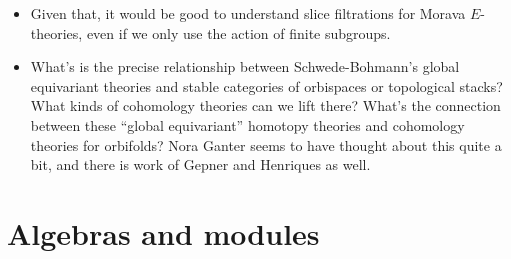 \documentclass[12pt,titlepage]{article}
\theoremstyle{plain}
\theoremstyle{definition}
\theoremstyle{remark}
\begin{document}
\begin{itemize}
\item Given that, it would be good to understand slice filtrations for Morava $E$-theories, even if we only use the action of finite subgroups.


\item What'{}s is the precise relationship between Schwede-Bohmann'{}s global equivariant theories and stable categories of orbispaces or topological stacks? What kinds of cohomology theories can we lift there? What'{}s the connection between these ``{}global equivariant''{} homotopy theories and cohomology theories for orbifolds? Nora Ganter seems to have thought about this quite a bit, and there is work of Gepner and Henriques as well.



\end{itemize}
\section{Algebras and modules}
\end{document}
